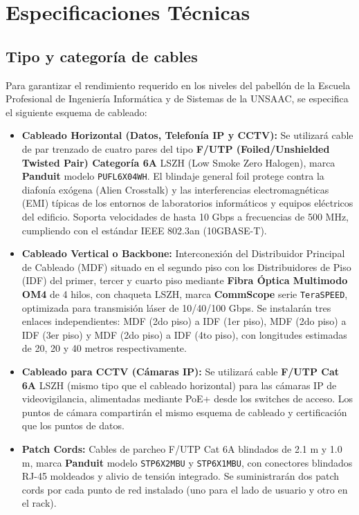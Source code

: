 \chapter{Especificaciones Técnicas}

\section{Tipo y categoría de cables}

Para garantizar el rendimiento requerido en los \totalPisos{} niveles del pabellón de la Escuela Profesional de Ingeniería Informática y de Sistemas de la UNSAAC, se especifica el siguiente esquema de cableado:

\begin{itemize}
    \item \textbf{Cableado Horizontal (Datos, Telefonía IP y CCTV):} Se utilizará cable de par trenzado de cuatro pares del tipo \textbf{F/UTP (Foiled/Unshielded Twisted Pair) Categoría 6A} LSZH (Low Smoke Zero Halogen), marca \textbf{Panduit} modelo \texttt{PUFL6X04WH}. El blindaje general foil protege contra la diafonía exógena (Alien Crosstalk) y las interferencias electromagnéticas (EMI) típicas de los entornos de laboratorios informáticos y equipos eléctricos del edificio. Soporta velocidades de hasta 10 Gbps a frecuencias de 500 MHz, cumpliendo con el estándar IEEE 802.3an (10GBASE-T).
    \item \textbf{Cableado Vertical o Backbone:} Interconexión del Distribuidor Principal de Cableado (MDF) situado en el segundo piso con los Distribuidores de Piso (IDF) del primer, tercer y cuarto piso mediante \textbf{Fibra Óptica Multimodo OM4} de 4 hilos, con chaqueta LSZH, marca \textbf{CommScope} serie \texttt{TeraSPEED}, optimizada para transmisión láser de 10/40/100 Gbps. Se instalarán tres enlaces independientes: MDF (2do piso) a IDF (1er piso), MDF (2do piso) a IDF (3er piso) y MDF (2do piso) a IDF (4to piso), con longitudes estimadas de 20, 20 y 40 metros respectivamente.
    \item \textbf{Cableado para CCTV (Cámaras IP):} Se utilizará cable \textbf{F/UTP Cat 6A} LSZH (mismo tipo que el cableado horizontal) para las cámaras IP de videovigilancia, alimentadas mediante PoE+ desde los switches de acceso. Los puntos de cámara compartirán el mismo esquema de cableado y certificación que los puntos de datos.
    \item \textbf{Patch Cords:} Cables de parcheo F/UTP Cat 6A blindados de 2.1 m y 1.0 m, marca \textbf{Panduit} modelo \texttt{STP6X2MBU} y \texttt{STP6X1MBU}, con conectores blindados RJ-45 moldeados y alivio de tensión integrado. Se suministrarán dos patch cords por cada punto de red instalado (uno para el lado de usuario y otro en el rack).
\end{itemize}

